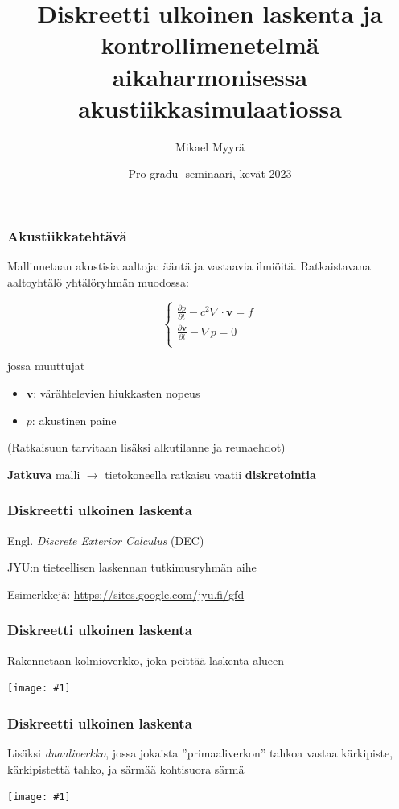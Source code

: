 \documentclass{beamer}
\title{Diskreetti ulkoinen laskenta ja kontrollimenetelmä aikaharmonisessa akustiikkasimulaatiossa}
\author{Mikael Myyrä}
\date{Pro gradu -seminaari, kevät 2023}
\newcommand{\img}[1]{
  \begin{center}
    \texttt{[image: \#1]}
  \end{center}
}
\begin{document}
\frame{\titlepage}

\begin{frame}
  \frametitle{Akustiikkatehtävä}

  Mallinnetaan akustisia aaltoja: ääntä ja vastaavia ilmiöitä.
  Ratkaistavana aaltoyhtälö yhtälöryhmän muodossa:

  \[
    \begin{cases}
      \frac{\partial p}{\partial t} - c^2\nabla \cdot \mathbf{v} = f \\
      \frac{\partial \mathbf{v}}{\partial t} - \nabla p = 0 \\
    \end{cases}
  \]

  \pause

  jossa muuttujat
  \begin{itemize}
    \item $\mathbf{v}$: värähtelevien hiukkasten nopeus
    \item $p$: akustinen paine
  \end{itemize}

  (Ratkaisuun tarvitaan lisäksi alkutilanne ja reunaehdot)

  \pause

  \textbf{Jatkuva} malli
  $\rightarrow$ tietokoneella ratkaisu vaatii \textbf{diskretointia}
\end{frame}

\begin{frame}
  \frametitle{Diskreetti ulkoinen laskenta}

  Engl. \textit{Discrete Exterior Calculus} (DEC)

  JYU:n tieteellisen laskennan tutkimusryhmän aihe

  Esimerkkejä: \url{https://sites.google.com/jyu.fi/gfd}
\end{frame}

\begin{frame}
  \frametitle{Diskreetti ulkoinen laskenta}

  Rakennetaan kolmioverkko, joka peittää laskenta-alueen

  \img{dec_mesh_primal.pdf}

\end{frame}

\begin{frame}
  \frametitle{Diskreetti ulkoinen laskenta}

  Lisäksi \textit{duaaliverkko}, jossa jokaista ''primaaliverkon''
  tahkoa vastaa kärkipiste, kärkipistettä tahko,
  ja särmää kohtisuora särmä

  \img{dec_mesh_dual.pdf}

\end{frame}
\end{document}
